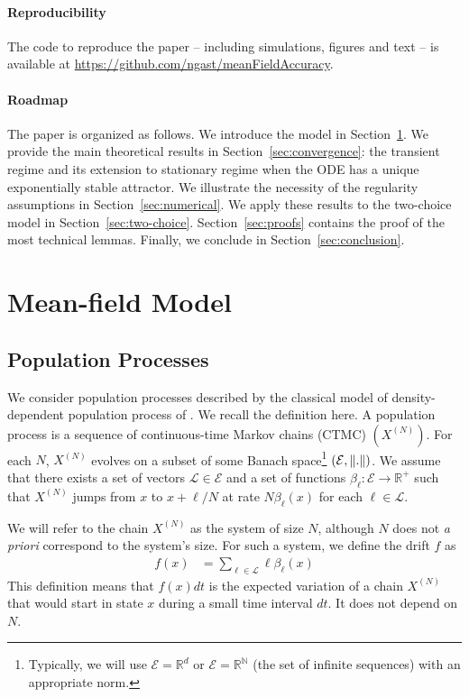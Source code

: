 \documentclass[sigconf]{acmart}
\newcommand\XN{X^{(N)}}
\newcommand\E{\mathcal{E}}
\newcommand\N{\mathbb{N}}
\newcommand\R{\mathbb{R}}
\newcommand\calL{\mathcal{L}}
\newcommand\norm[1]{{\mathchoice{\bnorm{#1}}{\snorm{#1}}{\snorm{#1}}{\snorm{#1}}}}
\newcommand\bnorm[1]{\left\|#1\right\|}
\newcommand\snorm[1]{\|#1\|}
\begin{document}
\newcommand\githublink{\url{https://github.com/ngast/meanFieldAccuracy}}
\paragraph*{Reproducibility} The code to reproduce the paper --
including simulations, figures and text -- is available at
\githublink. 


\paragraph*{Roadmap} The paper is organized as follows. We introduce
the model in Section~\ref{sec:model}.  We provide the main theoretical
results in Section~\ref{sec:convergence}: the transient regime and its
extension to stationary regime when the ODE has a unique exponentially
stable attractor.
We illustrate the necessity of the regularity assumptions in
Section~\ref{sec:numerical}. We apply these results to the two-choice
model in Section~\ref{sec:two-choice}. Section~\ref{sec:proofs}
contains the proof of the most technical lemmas. 
Finally, we conclude
in Section~\ref{sec:conclusion}.



\section{Mean-field Model}
\label{sec:model}


\subsection{Population Processes}

We consider population processes described by the classical model of
density-dependent population process of
\cite{kurtz70,kurtz1978strong}. We recall the definition here. A
population process is a sequence of continuous-time Markov chains
(CTMC) $(\XN)$. For each $N$, $\XN$ evolves on a subset of some Banach
space\footnote{Typically, we will use $\E=\R^d$ or $\E=\R^{\N}$ (the
  set of infinite sequences) with an appropriate norm.}
$(\E,\norm{.})$. We assume that there exists a set of vectors
$\calL\in \E$ and a set of functions $\beta_\ell:\E\to\R^+$ such that
$\XN$ jumps from $x$ to $x+\ell/N$ at rate $N \beta_\ell(x)$ for each
$\ell\in\calL$.

We will refer to the chain $\XN$ as the system of size $N$, although
$N$ does not \emph{a priori} correspond to the system's size.  For
such a system, we define the drift $f$ as
\begin{align*}
  f(x) &= \sum_{\ell\in\calL}\ell\beta_\ell(x) 
\end{align*}
This definition means that $f(x)dt$ is the expected variation of a
chain $\XN$ that would start in state $x$ during a small time interval
$dt$. It does not depend on $N$. 
\end{document}
